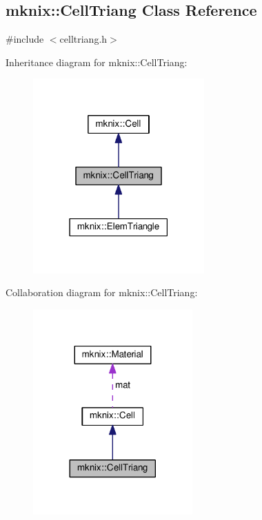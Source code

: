 \hypertarget{classmknix_1_1_cell_triang}{}\subsection{mknix\+:\+:Cell\+Triang Class Reference}
\label{classmknix_1_1_cell_triang}


{\ttfamily \#include $<$celltriang.\+h$>$}



Inheritance diagram for mknix\+:\+:Cell\+Triang\+:\nopagebreak
\begin{figure}[H]
\begin{center}
\leavevmode
\includegraphics[width=186pt]{d9/d69/classmknix_1_1_cell_triang__inherit__graph}
\end{center}
\end{figure}


Collaboration diagram for mknix\+:\+:Cell\+Triang\+:\nopagebreak
\begin{figure}[H]
\begin{center}
\leavevmode
\includegraphics[width=173pt]{d0/db3/classmknix_1_1_cell_triang__coll__graph}
\end{center}
\end{figure}

